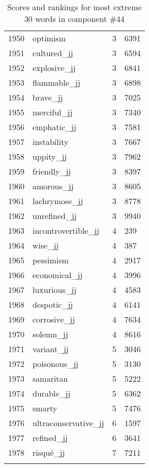 \begin{longtable}[!htbp]{| rlr@{.}l |}
    1950 & optimism & 3 & 6391 \\
    1951 & cultured\_jj & 3 & 6594 \\
    1952 & explosive\_jj & 3 & 6841 \\
    1953 & flammable\_jj & 3 & 6898 \\
    1954 & brave\_jj & 3 & 7025 \\
    1955 & merciful\_jj & 3 & 7340 \\
    1956 & emphatic\_jj & 3 & 7581 \\
    1957 & instability & 3 & 7667 \\
    1958 & uppity\_jj & 3 & 7962 \\
    1959 & friendly\_jj & 3 & 8397 \\
    1960 & amorous\_jj & 3 & 8605 \\
    1961 & lachrymose\_jj & 3 & 8778 \\
    1962 & unrefined\_jj & 3 & 9940 \\
    1963 & incontrovertible\_jj & 4 & 239 \\
    1964 & wise\_jj & 4 & 387 \\
    1965 & pessimism & 4 & 2917 \\
    1966 & economical\_jj & 4 & 3996 \\
    1967 & luxurious\_jj & 4 & 4583 \\
    1968 & despotic\_jj & 4 & 6141 \\
    1969 & corrosive\_jj & 4 & 7634 \\
    1970 & solemn\_jj & 4 & 8616 \\
    1971 & variant\_jj & 5 & 3046 \\
    1972 & poisonous\_jj & 5 & 3130 \\
    1973 & samaritan & 5 & 5222 \\
    1974 & durable\_jj & 5 & 6362 \\
    1975 & smarty & 5 & 7476 \\
    1976 & ultraconservative\_jj & 6 & 1597 \\
    1977 & refined\_jj & 6 & 3641 \\
    1978 & risqué\_jj & 7 & 7211 \\
    \hline
    \caption{Scores and rankings for most extreme 30 words in component \#44} \\
\end{longtable}
